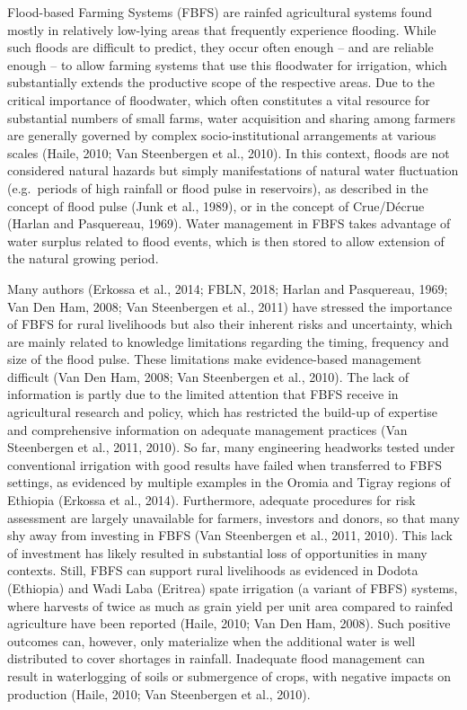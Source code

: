 \documentclass[]{elsarticle} %
\begin{document}
Flood-based Farming Systems (FBFS) are rainfed agricultural systems found mostly in relatively low-lying areas that frequently experience flooding. While such floods are difficult to predict, they occur often enough -- and are reliable enough -- to allow farming systems that use this floodwater for irrigation, which substantially extends the productive scope of the respective areas. Due to the critical importance of floodwater, which often constitutes a vital resource for substantial numbers of small farms, water acquisition and sharing among farmers are generally governed by complex socio-institutional arrangements at various scales (Haile, 2010; Van Steenbergen et al., 2010). In this context, floods are not considered natural hazards but simply manifestations of natural water fluctuation (e.g.~periods of high rainfall or flood pulse in reservoirs), as described in the concept of flood pulse (Junk et al., 1989), or in the concept of Crue/Décrue (Harlan and Pasquereau, 1969). Water management in FBFS takes advantage of water surplus related to flood events, which is then stored to allow extension of the natural growing period.

Many authors (Erkossa et al., 2014; FBLN, 2018; Harlan and Pasquereau, 1969; Van Den Ham, 2008; Van Steenbergen et al., 2011) have stressed the importance of FBFS for rural livelihoods but also their inherent risks and uncertainty, which are mainly related to knowledge limitations regarding the timing, frequency and size of the flood pulse. These limitations make evidence-based management difficult (Van Den Ham, 2008; Van Steenbergen et al., 2010). The lack of information is partly due to the limited attention that FBFS receive in agricultural research and policy, which has restricted the build-up of expertise and comprehensive information on adequate management practices (Van Steenbergen et al., 2011, 2010). So far, many engineering headworks tested under conventional irrigation with good results have failed when transferred to FBFS settings, as evidenced by multiple examples in the Oromia and Tigray regions of Ethiopia (Erkossa et al., 2014). Furthermore, adequate procedures for risk assessment are largely unavailable for farmers, investors and donors, so that many shy away from investing in FBFS (Van Steenbergen et al., 2011, 2010). This lack of investment has likely resulted in substantial loss of opportunities in many contexts. Still, FBFS can support rural livelihoods as evidenced in Dodota (Ethiopia) and Wadi Laba (Eritrea) spate irrigation (a variant of FBFS) systems, where harvests of twice as much as grain yield per unit area compared to rainfed agriculture have been reported (Haile, 2010; Van Den Ham, 2008). Such positive outcomes can, however, only materialize when the additional water is well distributed to cover shortages in rainfall. Inadequate flood management can result in waterlogging of soils or submergence of crops, with negative impacts on production (Haile, 2010; Van Steenbergen et al., 2010).
\end{document}
